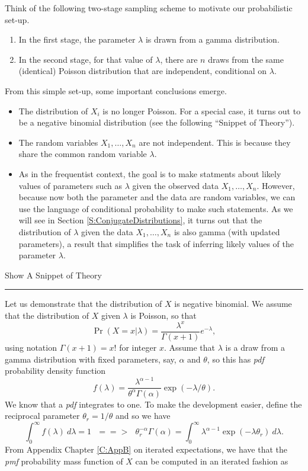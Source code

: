 \documentclass[]{book}
\providecommand{\tightlist}{%
  \setlength{\itemsep}{0pt}\setlength{\parskip}{0pt}}
\theoremstyle{definition}
\theoremstyle{definition}
\theoremstyle{definition}
\theoremstyle{remark}
\begin{document}
Think of the following two-stage sampling scheme to motivate our
probabilistic set-up.

\begin{enumerate}
\def\labelenumi{\arabic{enumi}.}
\tightlist
\item
  In the first stage, the parameter \(\lambda\) is drawn from a gamma
  distribution.
\item
  In the second stage, for that value of \(\lambda\), there are \(n\)
  draws from the same (identical) Poisson distribution that are
  independent, conditional on \(\lambda\).
\end{enumerate}

From this simple set-up, some important conclusions emerge.

\begin{itemize}
\tightlist
\item
  The distribution of \(X_i\) is no longer Poisson. For a special case,
  it turns out to be a negative binomial distribution (see the following
  ``Snippet of Theory'').
\item
  The random variables \(X_1, \ldots, X_n\) are not independent. This is
  because they share the common random variable \(\lambda\).
\item
  As in the frequentist context, the goal is to make statments about
  likely values of parameters such as \(\lambda\) given the observed
  data \(X_1, \ldots, X_n\). However, because now both the parameter and
  the data are random variables, we can use the language of conditional
  probability to make such statements. As we will see in Section
  \ref{S:ConjugateDistributions}, it turns out that the distribution of
  \(\lambda\) given the data \(X_1, \ldots, X_n\) is also gamma (with
  updated parameters), a result that simplifies the task of inferring
  likely values of the parameter \(\lambda\).
\end{itemize}

Show A Snippet of Theory

\hypertarget{TheoryBayesPoisson}{}
\begin{center}\rule{0.5\linewidth}{\linethickness}\end{center}

Let us demonstrate that the distribution of \(X\) is negative binomial.
We assume that the distribution of \(X\) given \(\lambda\) is Poisson,
so that \[
\Pr(X = x|\lambda) = \frac{\lambda^x}{\Gamma(x+1)} e^{-\lambda} ,
\] using notation \(\Gamma(x+1) = x!\) for integer \(x\). Assume that
\(\lambda\) is a draw from a gamma distribution with fixed parameters,
say, \(\alpha\) and \(\theta\), so this has \emph{pdf}{ probability
density function} \[
f(\lambda) = \frac{\lambda^{\alpha-1}}{\theta^{\alpha}\Gamma(\alpha)}\exp(-\lambda/\theta).
\] We know that a \emph{pdf} integrates to one. To make the development
easier, define the reciprocal parameter \(\theta_r = 1/\theta\) and so
we have \[
\int_0^{\infty} f(\lambda) ~d\lambda =1 ~~~ ==> ~~~ \theta_r^{-\alpha} \Gamma(\alpha) = \int_0^{\infty} \lambda^{\alpha-1} \exp\left(-\lambda\theta_r\right) ~
d\lambda .
\] From Appendix Chapter \ref{C:AppB} on iterated expectations, we have
that the \emph{pmf}{ probability mass function} of \(X\) can be computed
in an iterated fashion as
\end{document}
